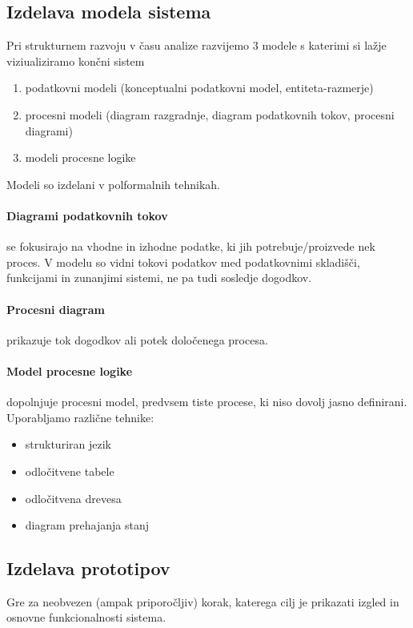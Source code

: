 \documentclass[a4paper,12pt]{report}
\begin{document}
   \subsection{Izdelava modela sistema}
   Pri strukturnem razvoju v času analize razvijemo 3 modele s katerimi si lažje viziualiziramo končni sistem
   \begin{enumerate}
      \item podatkovni modeli (konceptualni podatkovni model, entiteta-razmerje)
      \item procesni modeli (diagram razgradnje, diagram podatkovnih tokov, procesni diagrami)
      \item modeli procesne logike
   \end{enumerate}

   Modeli so izdelani v polformalnih tehnikah.

   \paragraph{Diagrami podatkovnih tokov} se fokusirajo na vhodne in izhodne podatke, ki jih potrebuje/proizvede nek proces.
   V modelu so vidni tokovi podatkov med podatkovnimi skladišči, funkcijami in zunanjimi sistemi, ne pa tudi sosledje dogodkov.

   \paragraph{Procesni diagram} prikazuje tok dogodkov ali potek določenega procesa.

   \paragraph{Model procesne logike} dopolnjuje procesni model, predvsem tiste procese, ki niso dovolj jasno definirani. Uporabljamo različne tehnike:
   \begin{itemize}
      \item strukturiran jezik
      \item odločitvene tabele
      \item odločitvena drevesa
      \item diagram prehajanja stanj
   \end{itemize}

   \subsection{Izdelava prototipov}
   Gre za neobvezen (ampak priporočljiv) korak, katerega cilj je prikazati izgled in osnovne funkcionalnosti sistema.
\end{document}

